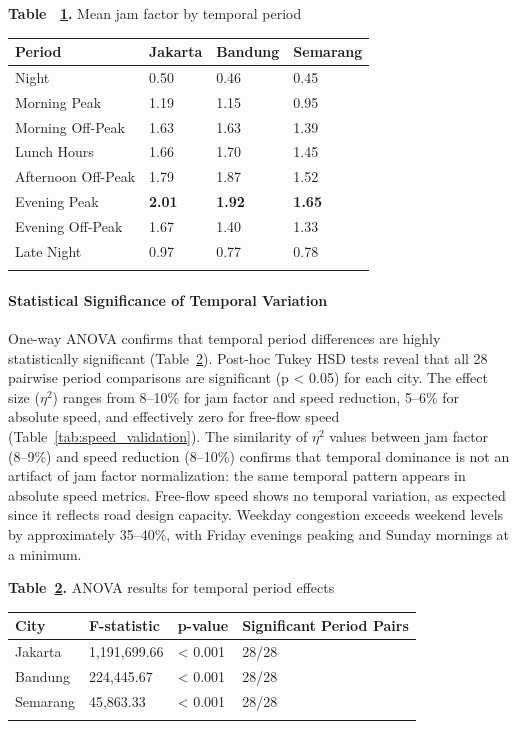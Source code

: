 \documentclass[12pt,a4paper]{article}
\begin{document}
\textbf{Table ~\ref{tab:table6_meanjam}.} Mean jam factor by temporal period

\begin{longtable}[]{@{}llll@{}}
\toprule\noalign{}
Period & Jakarta & Bandung & Semarang \\
\midrule\noalign{}
\endhead
\bottomrule\noalign{}
\endlastfoot
Night & 0.50 & 0.46 & 0.45 \\
Morning Peak & 1.19 & 1.15 & 0.95 \\
Morning Off-Peak & 1.63 & 1.63 & 1.39 \\
Lunch Hours & 1.66 & 1.70 & 1.45 \\
Afternoon Off-Peak & 1.79 & 1.87 & 1.52 \\
Evening Peak & \textbf{2.01} & \textbf{1.92} & \textbf{1.65} \\
Evening Off-Peak & 1.67 & 1.40 & 1.33 \\
Late Night & 0.97 & 0.77 & 0.78 \\
\label{tab:table6_meanjam}
\end{longtable}

\paragraph{Statistical Significance of Temporal Variation}

One-way ANOVA confirms that temporal period differences are highly statistically significant (Table~\ref{tab:table_anova}). Post-hoc Tukey HSD tests reveal that all 28 pairwise period comparisons are significant (p < 0.05) for each city. The effect size ($\eta^2$) ranges from 8--10\% for jam factor and speed reduction, 5--6\% for absolute speed, and effectively zero for free-flow speed (Table~\ref{tab:speed_validation}). The similarity of $\eta^2$ values between jam factor (8--9\%) and speed reduction (8--10\%) confirms that temporal dominance is not an artifact of jam factor normalization: the same temporal pattern appears in absolute speed metrics. Free-flow speed shows no temporal variation, as expected since it reflects road design capacity. Weekday congestion exceeds weekend levels by approximately 35--40\%, with Friday evenings peaking and Sunday mornings at a minimum.

\textbf{Table~\ref{tab:table_anova}.} ANOVA results for temporal period effects

\begin{longtable}[]{@{}llll@{}}
\toprule\noalign{}
City & F-statistic & p-value & Significant Period Pairs \\
\midrule\noalign{}
\endhead
\bottomrule\noalign{}
\endlastfoot
Jakarta & 1,191,699.66 & < 0.001 & 28/28 \\
Bandung & 224,445.67 & < 0.001 & 28/28 \\
Semarang & 45,863.33 & < 0.001 & 28/28 \\
\label{tab:table_anova}
\end{longtable}
\end{document}
